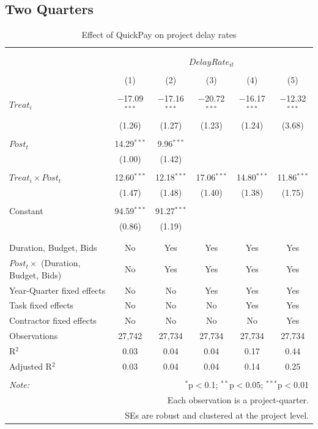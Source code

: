 \documentclass[
]{article}
\begin{document}
\hypertarget{two-quarters-1}{%
\subsection{Two Quarters}\label{two-quarters-1}}

\begin{table}[H] \centering 
  \caption{Effect of QuickPay on project delay rates} 
  \label{} 
\small 
\begin{tabular}{@{\extracolsep{-2pt}}lccccc} 
\\[-1.8ex]\hline 
\hline \\[-1.8ex] 
\\[-1.8ex] & \multicolumn{5}{c}{$DelayRate_{it}$} \\ 
\\[-1.8ex] & (1) & (2) & (3) & (4) & (5)\\ 
\hline \\[-1.8ex] 
 $Treat_i$ & $-$17.09$^{***}$ & $-$17.16$^{***}$ & $-$20.72$^{***}$ & $-$16.17$^{***}$ & $-$12.32$^{***}$ \\ 
  & (1.26) & (1.27) & (1.23) & (1.24) & (3.68) \\ 
  & & & & & \\ 
 $Post_t$ & 14.29$^{***}$ & 9.96$^{***}$ &  &  &  \\ 
  & (1.00) & (1.42) &  &  &  \\ 
  & & & & & \\ 
 $Treat_i \times Post_t$ & 12.60$^{***}$ & 12.18$^{***}$ & 17.06$^{***}$ & 14.80$^{***}$ & 11.86$^{***}$ \\ 
  & (1.47) & (1.48) & (1.40) & (1.38) & (1.75) \\ 
  & & & & & \\ 
 Constant & 94.59$^{***}$ & 91.27$^{***}$ &  &  &  \\ 
  & (0.86) & (1.19) &  &  &  \\ 
  & & & & & \\ 
\hline \\[-1.8ex] 
Duration, Budget, Bids & No & Yes & Yes & Yes & Yes \\ 
$Post_t \times$  (Duration, Budget, Bids) & No & Yes & Yes & Yes & Yes \\ 
Year-Quarter fixed effects & No & No & Yes & Yes & Yes \\ 
Task fixed effects & No & No & No & Yes & Yes \\ 
Contractor fixed effects & No & No & No & No & Yes \\ 
Observations & 27,742 & 27,734 & 27,734 & 27,734 & 27,734 \\ 
R$^{2}$ & 0.03 & 0.04 & 0.04 & 0.17 & 0.44 \\ 
Adjusted R$^{2}$ & 0.03 & 0.04 & 0.04 & 0.14 & 0.25 \\ 
\hline 
\hline \\[-1.8ex] 
\textit{Note:}  & \multicolumn{5}{r}{$^{*}$p$<$0.1; $^{**}$p$<$0.05; $^{***}$p$<$0.01} \\ 
 & \multicolumn{5}{r}{Each observation is a project-quarter.} \\ 
 & \multicolumn{5}{r}{SEs are robust and clustered at the project level.} \\ 
\end{tabular} 
\end{table}
\end{document}
